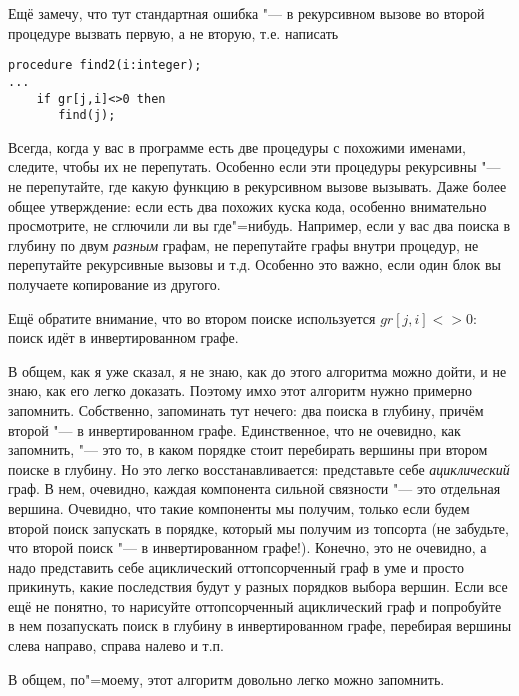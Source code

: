 Ещё замечу, что тут стандартная ошибка "--- в рекурсивном вызове во второй процедуре вызвать первую, а не вторую,
 т.е. написать
\begin{codesampleo}\begin{verbatim}
procedure find2(i:integer);
...
    if gr[j,i]<>0 then
       find(j);
\end{verbatim}
\end{codesampleo}
Всегда, когда у вас в программе есть две процедуры с похожими именами, следите, чтобы их не перепутать. Особенно если эти процедуры рекурсивны "--- не перепутайте, где какую функцию в рекурсивном вызове вызывать. Даже более общее утверждение: 
если есть два похожих куска кода, особенно внимательно просмотрите, не сглючили ли вы где"=нибудь. Например, если
у вас два поиска в глубину по двум \textit{разным} графам, не перепутайте графы внутри процедур, не перепутайте рекурсивные
вызовы и т.д. Особенно это важно, если один блок вы получаете копирование из другого.

Ещё обратите внимание, что во втором поиске используется $gr[j,i]<>0$: поиск идёт в инвертированном графе.

В общем, как я уже сказал, я не знаю, как до этого алгоритма можно дойти, и не знаю, как его легко доказать. Поэтому
имхо этот алгоритм нужно примерно запомнить. Собственно, запоминать тут нечего: два поиска в глубину, причём второй
"--- в инвертированном графе. Единственное, что не очевидно, как запомнить, "--- это то, в каком порядке стоит перебирать
вершины при втором поиске в глубину. Но это легко восстанавливается: представьте себе \textit{ациклический} граф.
В нем, очевидно, каждая компонента сильной связности "--- это отдельная вершина. Очевидно, что такие компоненты
мы получим, только если будем второй поиск запускать в порядке, который мы получим из топсорта (не забудьте, что 
второй поиск "--- в инвертированном графе!). Конечно, это не очевидно, а надо представить себе ациклический 
оттопсорченный граф в уме и просто прикинуть, какие последствия будут у разных порядков выбора вершин. Если все ещё 
не понятно, то нарисуйте оттопсорченный ациклический граф и попробуйте в нем позапускать поиск в глубину в инвертированном
графе, перебирая вершины слева направо, справа налево и т.п. 

В общем, по"=моему, этот алгоритм довольно легко можно запомнить.


